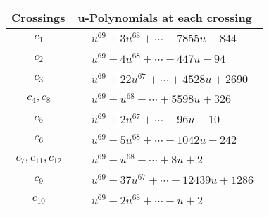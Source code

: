 \documentclass[1p]{elsarticle_modified}
\theoremstyle{definition}
\begin{document}
\begin{tabular}{m{50pt}|m{274pt}}
Crossings & \hspace{64pt}u-Polynomials at each crossing \\
\hline $$\begin{aligned}c_{1}\end{aligned}$$&$\begin{aligned}
&u^{69}+3 u^{68}+\cdots-7855 u-844
\end{aligned}$\\
\hline $$\begin{aligned}c_{2}\end{aligned}$$&$\begin{aligned}
&u^{69}+4 u^{68}+\cdots-447 u-94
\end{aligned}$\\
\hline $$\begin{aligned}c_{3}\end{aligned}$$&$\begin{aligned}
&u^{69}+22 u^{67}+\cdots+4528 u+2690
\end{aligned}$\\
\hline $$\begin{aligned}c_{4},c_{8}\end{aligned}$$&$\begin{aligned}
&u^{69}+u^{68}+\cdots+5598 u+326
\end{aligned}$\\
\hline $$\begin{aligned}c_{5}\end{aligned}$$&$\begin{aligned}
&u^{69}+2 u^{67}+\cdots-96 u-10
\end{aligned}$\\
\hline $$\begin{aligned}c_{6}\end{aligned}$$&$\begin{aligned}
&u^{69}-5 u^{68}+\cdots-1042 u-242
\end{aligned}$\\
\hline $$\begin{aligned}c_{7},c_{11},c_{12}\end{aligned}$$&$\begin{aligned}
&u^{69}- u^{68}+\cdots+8 u+2
\end{aligned}$\\
\hline $$\begin{aligned}c_{9}\end{aligned}$$&$\begin{aligned}
&u^{69}+37 u^{67}+\cdots-12439 u+1286
\end{aligned}$\\
\hline $$\begin{aligned}c_{10}\end{aligned}$$&$\begin{aligned}
&u^{69}+2 u^{68}+\cdots+u+2
\end{aligned}$\\
\hline
\end{tabular}\\~\\
\end{document}
